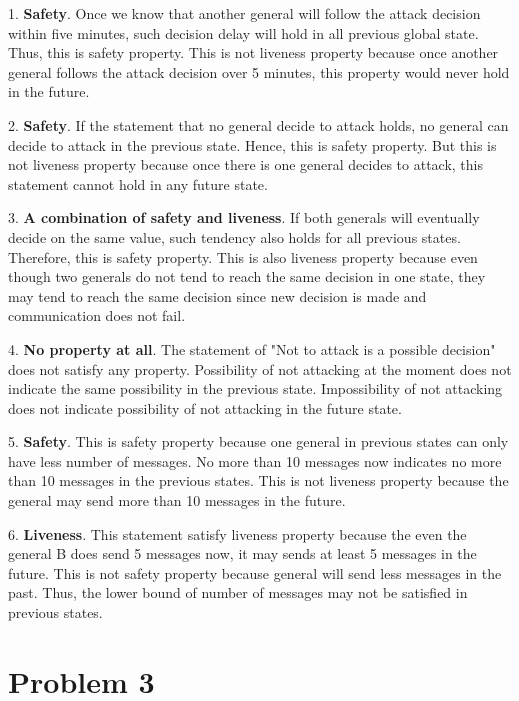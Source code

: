\documentclass[11pt,a4paper]{article}
\begin{document}
1. \textbf{Safety}. 
Once we know that another general will follow the attack decision within five
minutes, such decision delay will hold in all previous global state. Thus,
this is safety property. This is not liveness property because once another
general follows the attack decision over 5 minutes, this property would never
hold in the future.

2. \textbf{Safety}. If the statement that no general decide to attack holds, no
general can decide to attack in the previous state. Hence, this is safety
property. But this is not liveness property because once there is one general
decides to attack, this statement cannot hold in any future state.

3. \textbf{A combination of safety and liveness}. If both generals will eventually
decide on the same value, such tendency also holds for all previous states.
Therefore, this is safety property. This is also liveness property because
even though two generals do not tend to reach the same decision in one state,
they may tend to reach the same decision since new decision is made and
communication does not fail.

4. \textbf{No property at all}. The statement of "Not to attack is a possible
decision" does not satisfy any property. Possibility of not attacking at the
moment does not indicate the same possibility in the previous state.
Impossibility of not attacking does not indicate possibility of not attacking
in the future state.

5. \textbf{Safety}. This is safety property because one general in previous
states can only have less number of messages. No more than 10 messages now
indicates no more than 10 messages in the previous states. This is not
liveness property because the general may send more than 10 messages in the
future.

6. \textbf{Liveness}. This statement satisfy liveness property because the
even the general B does send 5 messages now, it may sends at least 5 messages
in the future. This is not safety property because general will send less
messages in the past. Thus, the lower bound of number of messages may not be
satisfied in previous states.

\newpage
\section{Problem 3}
\end{document}
